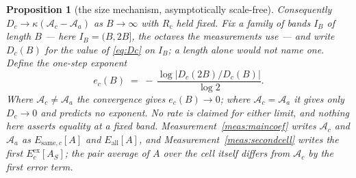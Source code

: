 \documentclass[11pt,a4paper]{article}
\theoremstyle{plain}
\newtheorem{proposition}[theorem]{Proposition}
\theoremstyle{definition}
\theoremstyle{remark}
\begin{document}
\begin{proposition}[the size mechanism, asymptotically scale-free]
Consequently $D_c\to\kappa(\mathcal A_c-\mathcal A_a)$ as
$B\to\infty$ with $R_c$ held fixed. Fix a family of bands $I_B$ of
length $B$ --- here $I_B=(B,2B]$, the octaves the measurements use ---
and write $D_c(B)$ for the value of \eqref{eq:Dc} on $I_B$; a length
alone would not name one. Define the one-step exponent
\begin{equation}\label{eq:ec}
  e_c(B)\;=\;-\,\frac{\log\bigl|D_c(2B)/D_c(B)\bigr|}{\log 2}.
\end{equation}
Where $\mathcal A_c\neq\mathcal A_a$ the convergence gives
$e_c(B)\to0$; where $\mathcal A_c=\mathcal A_a$ it gives only
$D_c\to0$ and predicts no exponent. No rate is claimed for either
limit, and nothing here asserts equality at a fixed band.
Measurement~\ref{meas:maincoef} writes $\mathcal A_c$ and
$\mathcal A_a$ as $E_{\mathrm{same},c}[A]$ and $E_{\mathrm{all}}[A]$,
and Measurement~\ref{meas:secondcell} writes the first
$E^{\mathrm{ex}}_c[A_S]$; the pair average of $A$ over the cell itself
differs from $\mathcal A_c$ by the first error term.
\end{proposition}
\end{document}
